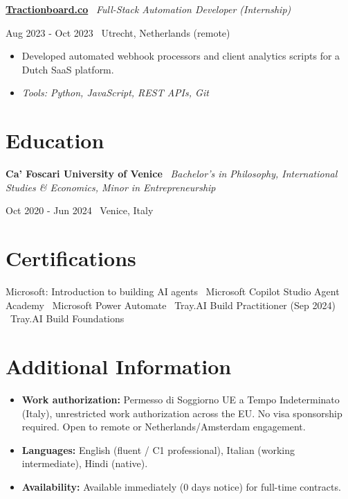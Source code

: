 \documentclass[a4paper,10pt]{article}
\newcommand{\role}[4]{%
  \vspace{2pt}\noindent
  \begin{minipage}[t]{0.70\textwidth}\raggedright\textbf{#1} \textbullet\ \textit{#3}\end{minipage}%
  \hfill
  \begin{minipage}[t]{0.28\textwidth}\raggedleft\footnotesize\color{gray}#2 \textbullet\ #4\end{minipage}%
  \vspace{1pt}%
}
\begin{document}
\role{\href{https://tractionboard.co}{Tractionboard.co}}{Aug 2023 - Oct 2023}{Full-Stack Automation Developer (Internship)}{Utrecht, Netherlands (remote)}
\begin{itemize}
  \item Developed automated webhook processors and client analytics scripts for a Dutch SaaS platform.
  \item \textit{Tools: Python, JavaScript, REST APIs, Git}
\end{itemize}

\section{Education}
\role{Ca' Foscari University of Venice}{Oct 2020 - Jun 2024}{Bachelor's in Philosophy, International Studies \& Economics, Minor in Entrepreneurship}{Venice, Italy}

\section{Certifications}
Microsoft: Introduction to building AI agents \textbullet\ Microsoft Copilot Studio Agent Academy \textbullet\ Microsoft Power Automate \textbullet\ Tray.AI Build Practitioner (Sep 2024) \textbullet\ Tray.AI Build Foundations

\section{Additional Information}
\begin{itemize}
  \item \textbf{Work authorization:} Permesso di Soggiorno UE a Tempo Indeterminato (Italy), unrestricted work authorization across the EU. No visa sponsorship required. Open to remote or Netherlands/Amsterdam engagement.
  \item \textbf{Languages:} English (fluent / C1 professional), Italian (working intermediate), Hindi (native).
  \item \textbf{Availability:} Available immediately (0 days notice) for full-time contracts.
\end{itemize}

\end{document}
